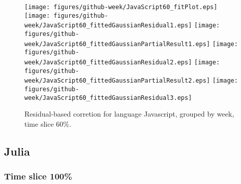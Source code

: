 \begin{figure}[t]
\centering
{}
{\texttt{[image: figures/github-week/JavaScript60\_fitPlot.eps]}}
{\texttt{[image: figures/github-week/JavaScript60\_fittedGaussianResidual1.eps]}}
{\texttt{[image: figures/github-week/JavaScript60\_fittedGaussianPartialResult1.eps]}}
{\texttt{[image: figures/github-week/JavaScript60\_fittedGaussianResidual2.eps]}}
{\texttt{[image: figures/github-week/JavaScript60\_fittedGaussianPartialResult2.eps]}}
{\texttt{[image: figures/github-week/JavaScript60\_fittedGaussianResidual3.eps]}}
\caption{Residual-based corretion for language Javascript, grouped by week, time slice 60\%.}
\end{figure}


\FloatBarrier


\subsection{Julia}

\subsubsection{Time slice 100\%}

